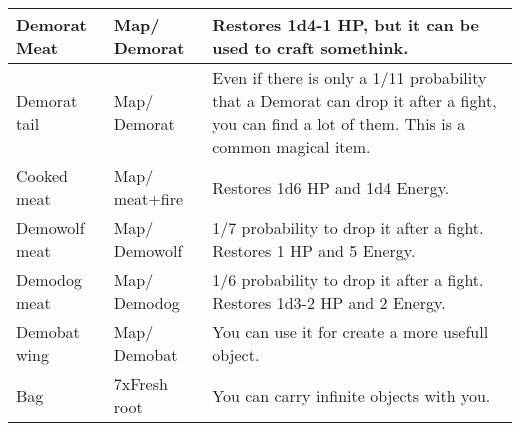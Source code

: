 \begin{center}
\begin{tabular}[c]{| p{2cm} | p{} | p{5cm} |}
		Demorat Meat & Map/ Demorat & Restores 1d4-1 HP, but it can be used to craft somethink.\\
		\hline
		Demorat tail &  Map/ Demorat & Even if there is only a 1/11 probability that a Demorat can drop it after a fight, you can find a lot of them. This is a common magical item.\\
		\hline
		Cooked meat &  Map/ meat+fire & Restores 1d6 HP and 1d4 Energy.\\
		\hline
		Demowolf meat &   Map/ Demowolf & 1/7 probability to drop it after a fight. Restores 1 HP and 5 Energy.\\
		\hline
		Demodog meat &  Map/ Demodog & 1/6 probability to drop it after a fight. Restores 1d3-2 HP and 2 Energy.\\
		\hline
		Demobat wing & Map/ Demobat & You can use it for create a more usefull object.\\
		\hline
		Bag & 7xFresh root& You can carry infinite objects with you.\\
		\hline
			\end{tabular}
	\end{center}

\newpage
